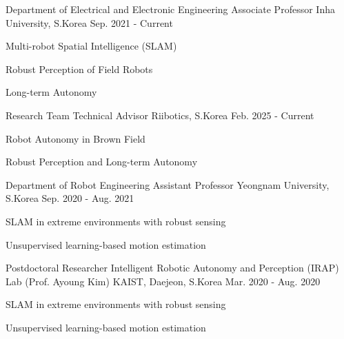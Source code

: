 

\begin{cventries}

  \cventry
    {Department of Electrical and Electronic Engineering} %
    {Associate Professor} %
    {Inha University, S.Korea} %
    {Sep. 2021 - Current} %
    {
      \begin{cvitems} %
        \item {Multi-robot Spatial Intelligence (SLAM)}
        \item {Robust Perception of Field Robots}
        \item {Long-term Autonomy}
      \end{cvitems}
    }


  \cventry
    {Research Team} %
    {Technical Advisor} %
    {Riibotics, S.Korea} %
    {Feb. 2025 - Current} %
    {
      \begin{cvitems} %
        \item {Robot Autonomy in Brown Field}
        \item {Robust Perception and Long-term Autonomy}
      \end{cvitems}
    }    

  \cventry
    {Department of Robot Engineering} %
    {Assistant Professor} %
    {Yeongnam University, S.Korea} %
    {Sep. 2020 - Aug. 2021} %
    {
      \begin{cvitems} %
        \item {SLAM in extreme environments with robust sensing}
        \item {Unsupervised learning-based motion estimation}
      \end{cvitems}
    }

  \cventry
    {Postdoctoral Researcher} %
    {Intelligent Robotic Autonomy and Perception (IRAP) Lab (Prof. Ayoung Kim)} %
    {KAIST, Daejeon, S.Korea} %
    {Mar. 2020 - Aug. 2020} %
    {
      \begin{cvitems} %
        \item {SLAM in extreme environments with robust sensing}
        \item {Unsupervised learning-based motion estimation}
      \end{cvitems}
    }


\end{cventries}
